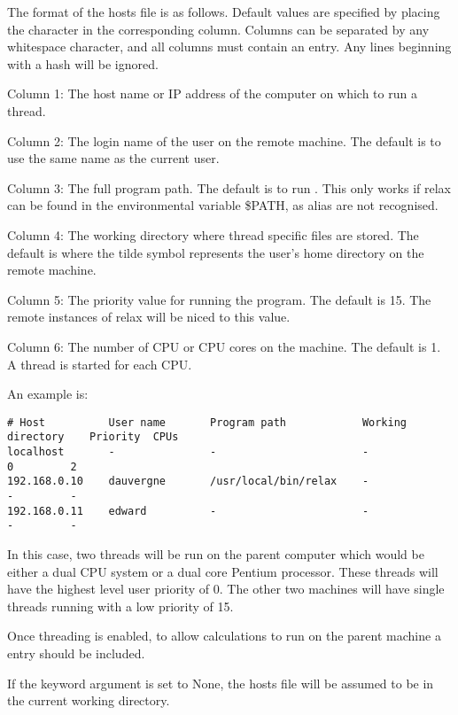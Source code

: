 The format of the hosts file is as follows.  Default values are specified by placing the
character 
 in the corresponding column.  Columns can be separated by any whitespace
character, and all columns must contain an entry.  Any lines beginning with a hash will be
ignored.

Column 1:  The host name or IP address of the computer on which to run a thread.

Column 2:  The login name of the user on the remote machine.  The default is to use the same
name as the current user.

Column 3:  The full program path.  The default is to run 
.  This only works if relax
can be found in the environmental variable \$PATH, as alias are not recognised.

Column 4:  The working directory where thread specific files are stored.  The default is
 where the tilde 
 symbol represents the user's home directory on the remote
machine.

Column 5:  The priority value for running the program.  The default is 15.  The remote
instances of relax will be niced to this value.

Column 6:  The number of CPU or CPU cores on the machine.  The default is 1.  A thread is
started for each CPU.

An example is:

{\footnotesize \begin{verbatim}
# Host          User name       Program path            Working directory    Priority  CPUs
localhost       -               -                       -                    0         2
192.168.0.10    dauvergne       /usr/local/bin/relax    -                    -         -
192.168.0.11    edward          -                       -                    -         -
\end{verbatim}}

In this case, two threads will be run on the parent computer which would be either a dual
CPU system or a dual core 
 Pentium processor.  These threads will have the
highest level user priority of 0.  The other two machines will have single threads running
with a low priority of 15.

Once threading is enabled, to allow calculations to run on the parent machine a 
entry should be included.


If the keyword argument 
 is set to None, the hosts file will be assumed to be in the
current working directory.


